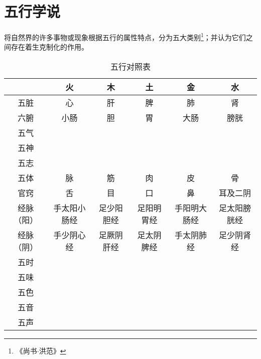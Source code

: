 
\section{五行学说}
将自然界的许多事物或现象根据五行的属性特点，分为五大类别\footnote{《尚书$\cdot$洪范》}；并认为它们之间存在着生克制化的作用。

\begin{table}[H]
  \centering
  \caption[]{五行对照表}
  \begin{tabular}{|c|c|c|c|c|c|}
    \hline & 火 & 木 & 土 & 金 & 水 \\
    \hline 五脏 & 心 & 肝 & 脾 & 肺 & 肾 \\
    \hline 六腑 & 小肠 & 胆 & 胃 & 大肠 & 膀胱 \\
    \hline 五气 & & & & & \\
    \hline 五神 & & & & & \\
    \hline 五志 & & & & & \\
    \hline 五体 & 脉 & 筋 & 肉 & 皮 & 骨 \\
    \hline 官窍 & 舌 & 目 & 口 & 鼻 & 耳及二阴 \\
    \hline 经脉（阳） & 手太阳小肠经 & 足少阳胆经 & 足阳明胃经 & 手阳明大肠经 & 足太阳膀胱经 \\
    \hline 经脉（阴） & 手少阴心经 & 足厥阴肝经 & 足太阴脾经 & 手太阴肺经 & 足少阴肾经 \\
    \hline 五时 & & & & & \\
    \hline 五味 & & & & & \\
    \hline 五色 & & & & & \\
    \hline 五音 & & & & & \\
    \hline 五声 & & & & & \\
    \hline
  \end{tabular}
\end{table}
